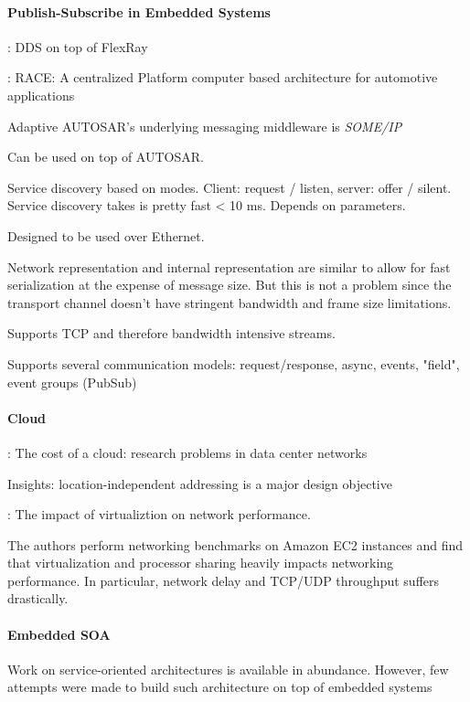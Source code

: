 \paragraph{Publish-Subscribe in Embedded Systems}

\cite{bouhouch2013dds}: DDS on top of FlexRay

\cite{sommer2013race}: RACE: A centralized Platform computer based architecture for automotive applications


Adaptive AUTOSAR's underlying messaging middleware is \emph{SOME/IP}

Can be used on top of AUTOSAR.

Service discovery based on modes. Client: request / listen, server: offer / silent.
Service discovery takes is pretty fast < 10 ms. Depends on parameters.

Designed to be used over Ethernet.

Network representation and internal representation are similar to allow for fast serialization at the expense of message size. But this is not a problem since the transport channel doesn't have stringent bandwidth and frame size limitations.

Supports TCP and therefore bandwidth intensive streams.

Supports several communication models: request/response, async, events, "field", event groups (PubSub)


\paragraph{Cloud}
\cite{greenberg2008cost}: The cost of a cloud: research problems in data center networks

Insights: location-independent addressing is a major design objective




\cite{wang2010impact}: The impact of virtualiztion on network performance.

The authors perform networking benchmarks on Amazon EC2 instances and find that virtualization and processor sharing heavily impacts networking performance. In particular, network delay and TCP/UDP throughput suffers drastically.


\paragraph{Embedded SOA}
Work on service-oriented architectures is available in abundance. However, few attempts were made to build such architecture on top of embedded systems

